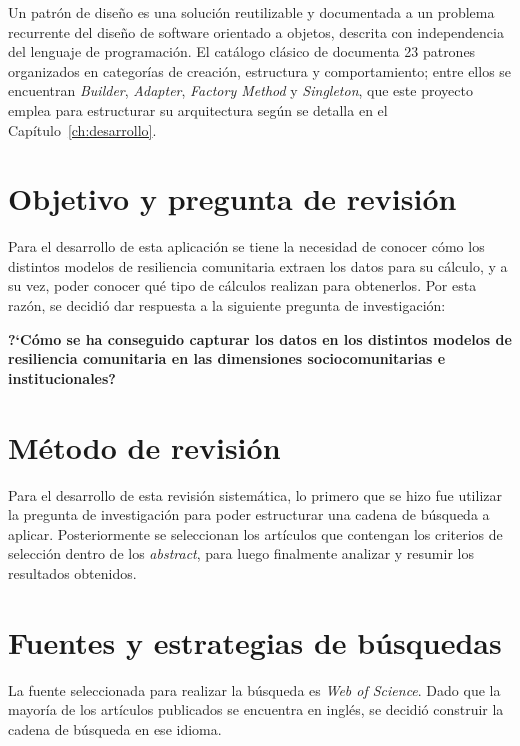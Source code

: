 \documentclass[12pt,letterpaper,oneside]{report}
\begin{document}
Un patr\'on de dise\~no es una soluci\'on reutilizable y documentada a un problema recurrente del dise\~no de software orientado a objetos, descrita con independencia del lenguaje de programaci\'on. El cat\'alogo cl\'asico de \textcite{gamma1994} documenta 23 patrones organizados en categor\'ias de creaci\'on, estructura y comportamiento; entre ellos se encuentran \textit{Builder}, \textit{Adapter}, \textit{Factory Method} y \textit{Singleton}, que este proyecto emplea para estructurar su arquitectura seg\'un se detalla en el Cap\'itulo~\ref{ch:desarrollo}.

\section{Objetivo y pregunta de revisi\'on}
\label{sec:objetivo-revision}

Para el desarrollo de esta aplicaci\'on se tiene la necesidad de conocer c\'omo los distintos modelos de resiliencia comunitaria extraen los datos para su c\'alculo, y a su vez, poder conocer qu\'e tipo de c\'alculos realizan para obtenerlos. Por esta raz\'on, se decidi\'o dar respuesta a la siguiente pregunta de investigaci\'on:

\textbf{?`C\'omo se ha conseguido capturar los datos en los distintos modelos de resiliencia comunitaria en las dimensiones sociocomunitarias e institucionales?}

\section{M\'etodo de revisi\'on}
\label{sec:metodo-revision}

Para el desarrollo de esta revisi\'on sistem\'atica, lo primero que se hizo fue utilizar la pregunta de investigaci\'on para poder estructurar una cadena de b\'usqueda a aplicar. Posteriormente se seleccionan los art\'iculos que contengan los criterios de selecci\'on dentro de los \textit{abstract}, para luego finalmente analizar y resumir los resultados obtenidos.

\section{Fuentes y estrategias de b\'usquedas}
\label{sec:fuentes-busqueda}

La fuente seleccionada para realizar la b\'usqueda es \textit{Web of Science}. Dado que la mayor\'ia de los art\'iculos publicados se encuentra en ingl\'es, se decidi\'o construir la cadena de b\'usqueda en ese idioma.
\end{document}
